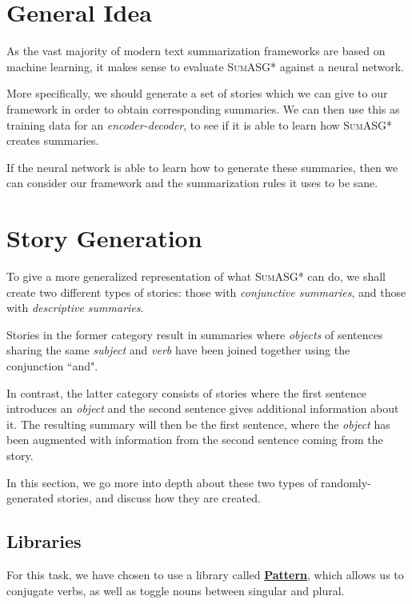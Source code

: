\label{chapter:evaluation}

\section{General Idea}

As the vast majority of modern text summarization frameworks are based on machine learning, it makes sense to evaluate \textsc{SumASG*} against a neural network.

More specifically, we should generate a set of stories which we can give to our framework in order to obtain corresponding summaries. We can then use this as training data for an \textit{encoder-decoder}, to see if it is able to learn how \textsc{SumASG*} creates summaries.

If the neural network is able to learn how to generate these summaries, then we can consider our framework and the summarization rules it uses to be sane.

\section{Story Generation}

To give a more generalized representation of what \textsc{SumASG*} can do, we shall create two different types of stories: those with \textit{conjunctive summaries}, and those with \textit{descriptive summaries}.

Stories in the former category result in summaries where \textit{objects} of sentences sharing the same \textit{subject} and \textit{verb} have been joined together using the conjunction ``and".

In contrast, the latter category consists of stories where the first sentence introduces an \textit{object} and the second sentence gives additional information about it. The resulting summary will then be the first sentence, where the \textit{object} has been augmented with information from the second sentence coming from the story.

In this section, we go more into depth about these two types of randomly-generated stories, and discuss how they are created.

\subsection{Libraries}

For this task, we have chosen to use a library called \textbf{\href{http://web.archive.org/web/20190516161631/https://www.clips.uantwerpen.be/pages/pattern-en}{Pattern}}, which allows us to conjugate verbs, as well as toggle nouns between singular and plural.

